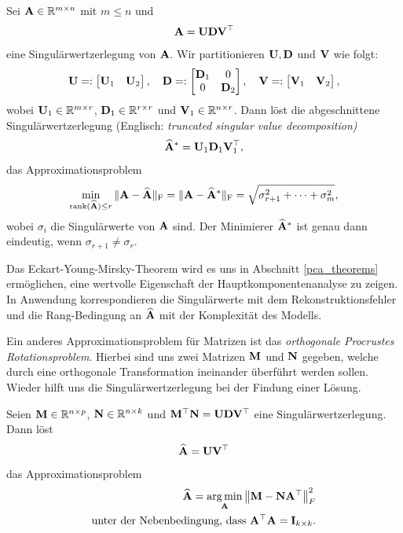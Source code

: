 \begin{thm}
Sei $\mathbf{A} \in \mathbb{R}^{m \times n}$ mit $m \leq n$ und 
$$\mathbf{A} = \mathbf{U}\mathbf{D} \mathbf{V}^{\top}$$
eine Singulärwertzerlegung von $\mathbf{A}$. Wir partitionieren $\mathbf{U}, \mathbf{D}$ und $\mathbf{V}$ wie folgt:
$$\mathbf{U} =: \begin{bmatrix} \mathbf{U}_1 & \mathbf{U}_2\end{bmatrix}, \quad 
\mathbf{D} =: \begin{bmatrix} \mathbf{D}_1 & 0 \\ 0 & \mathbf{D}_2 \end{bmatrix},\quad \mathbf{V} =: \begin{bmatrix} \mathbf{V}_1 & \mathbf{V}_2 \end{bmatrix},$$
wobei $\mathbf{U}_{1} \in \mathbb{R}^{m\times r}$, $\mathbf{D} _{1} \in \mathbb{R}^{r\times r}$ und $\mathbf{V}_{1} \in \mathbb{R}^{n\times r}$. Dann löst die abgeschnittene Singulärwertzerlegung (Englisch: \textit{truncated singular value decomposition)}
$$\widehat{\mathbf{A}}^* = \mathbf{U}_1 \mathbf{D}_1 \mathbf{V}_1^{\top},$$
das Approximationsproblem
\begin{align}
\min_{\operatorname{rank}(\widehat{\mathbf{A}}) \leq r} \|\mathbf{A}-\widehat{\mathbf{A}}\|_{\text{F}} = \|\mathbf{A}-\widehat{\mathbf{A}}^*\|_{\text{F}} = \sqrt{\sigma^2_{r+1} + \cdots + \sigma^2_m},
\end{align}
wobei $\sigma_i$ die Singulärwerte von $\mathbf{A}$ sind. Der Minimierer $\widehat{\mathbf{A}}^*$ ist genau dann eindeutig, wenn $\sigma_{r+1} \neq \sigma_{r}$.
\end{thm}

Das Eckart-Young-Mirsky-Theorem wird es uns in Abschnitt \ref{pca_theorems} ermöglichen, eine wertvolle Eigenschaft der Hauptkomponentenanalyse zu zeigen. In Anwendung korrespondieren die Singulärwerte mit dem Rekonstruktionsfehler und die Rang-Bedingung an $\widehat{\mathbf{A}}$ mit der Komplexität des Modells.

Ein anderes Approximationsproblem für Matrizen ist das \textit{orthogonale Procrustes Rotationsproblem}. Hierbei sind uns zwei Matrizen $\mathbf{M}$ und $\mathbf{N}$ gegeben, welche durch eine orthogonale Transformation ineinander überführt werden sollen. Wieder hilft uns die Singulärwertzerlegung bei der Findung einer Lösung.

\begin{thm}
Seien $\mathbf{M} \in \mathbb{R}^{n \times p}$, $\mathbf{N} \in \mathbb{R}^{n \times k}$ und $\mathbf{M}^{\top} \mathbf{N} = \mathbf{U}\mathbf{D} \mathbf{V}^{\top}$ eine Singulärwertzerlegung. Dann löst
$$\widehat{\mathbf{A}} = \mathbf{U} \mathbf{V}^{\top}$$
das Approximationsproblem
\begin{align}
\label{procrustes_rotation}
\begin{split}
\widehat{\mathbf{A}} = \operatorname*{arg\,min}_{\mathbf{A}} \left\lVert \mathbf{M} - \mathbf{N} \mathbf{A}^{\top} \right\rVert_F^2\\
\text{unter der Nebenbedingung, dass } \mathbf{A}^{\top} \mathbf{A} = \mathbf{I}_{k \times k}.
\end{split}
\end{align}
\end{thm}

